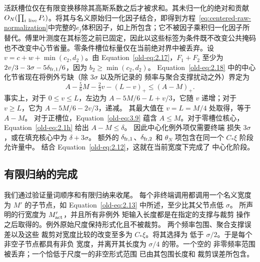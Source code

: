 \documentclass[11pt,a4paper]{article}
\numberwithin{equation}{section}
\numberwithin{figure}{section}
\theoremstyle{definition}
\theoremstyle{remark}
\begin{document}
活跃槽位仅在有限变换移除其高斯系数之后才被求和。其未归一化的绝对和贡献\(O_N(\prod_{i\ {\rm live}}P_i)\)。将其与名义原始归一化因子结合，即得到方程~\eqref{eq:centered-raw-normalization}中完整的\(e_j\)体积因子，如上所包含；它不被因子乘积归一化因子所替代。傅里叶测度在其标签之前已固定，因此以这些标签为条件既不改变公共掩码也不改变中心节省量。零条件槽位标量仅在当前绝对界中被丢弃。设 \(v=c+w+\min(c_2,d_2)\)。由
Equation~\eqref{old-eq:2.17}，\(F_1+F_2\) 至少为
\(2v/3-3\sigma-5\delta_{{\rm fr},1}/6\)，因为
\(b_2\ge\min(c_2,d_2)\)。
Equation~\eqref{old-eq:2.18} 中的中心化节省现在将例外亏缺（除 \(3\sigma\) 以及所记录的
频率与聚合支撑扰动之外）界定为
\begin{equation}
 A-\tfrac56M-\tfrac23v-(L-v)_+
 \le (A-M)_+.
 \label{old-eq:2.19}
\end{equation}
事实上，对于 \(0\le v\le L\)，左边为
\(A-5M/6-L+v/3\)，它随 \(v\) 递增；对于
\(v\ge L\)，它为 \(A-5M/6-2v/3\)，递减。
其最大值在 \(v=L=M/4\) 处取得，等于 \(A-M\)。
对于正槽位，Equation~\eqref{old-eq:3.9} 蕴含
\(A\le M\)。对于零槽位核心，
Equation~\eqref{old-eq:2.1h} 给出 \(A-M\le\delta\)。
因此中心化例外项仅需要终端
损失 \(3\sigma\)，或在填充核心中为 \(\delta+3\sigma\)。
额外的 \(\delta_{{\rm fr},1}\)、\(\delta_{{\rm fr},2}\)
和 \(\theta_N\) 项包含在同一个 \(C_*\xi\)
阶段允许量中。
结合 Equation~\eqref{old-eq:2.12}，这就在当前宽度下完成了
中心化阶段。

\subsection{有限归纳的完成}

我们通过验证量词顺序和有限归纳来收尾。
每个非终端调用都调用一个名义宽度为 \(M'\) 的子节点，如
Equation~\eqref{old-eq:2.13} 中所述，至少比其父节点低 \(\sigma\)。
所声明的行宽度为 \(M'_{\rm act}\)，并且所有非例外
矩输入长度都是在指定的支撑与裁剪
操作之后取得的。例外原始尺度保持形式化且不被裁剪。
两个频率包围、聚合支撑误差以及这些
裁剪对宽度比较的改变至多为 \(C_*\xi\)。将其选择为
低于 \(\sigma/2\)。于是每个非空子节点都具有非负
宽度，并离开其长度为 \(\sigma/4\) 的带。一个空的
非零频率范围被丢弃；一个恰低于尺度一的非空形式范围
已由其包围长度和
裁剪误差所包含。
\end{document}
